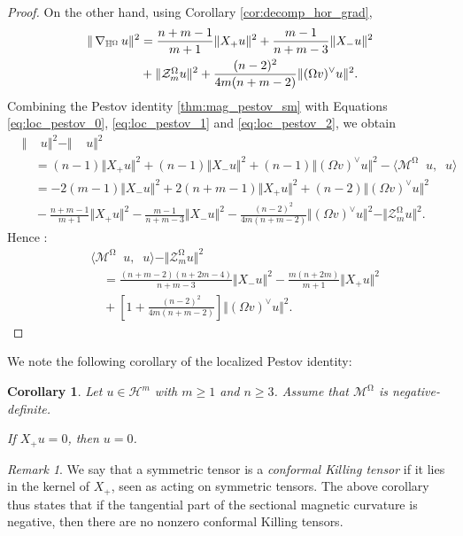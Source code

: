 \documentclass[12pt]{amsart}
\numberwithin{numbering}{section}
\theoremstyle{plain}
\newtheorem{csq}[numbering]{Corollary}
\theoremstyle{definition}
\theoremstyle{remark}
\newtheorem{rmq}[numbering]{Remark}
\numberwithin{equation}{section}
\DeclareMathOperator{\nv}{\nabla_{\mathbb{V}}}
\DeclareMathOperator{\nhs}{\nabla_{\mathbb{H}^{\mg}}}
\DeclareMathOperator{\xs}{\mathbb{X}^{\mg}}
\DeclareMathOperator{\mg}{\Omega}
\begin{document}
\begin{proof}
On the other hand, using Corollary \ref{cor:decomp_hor_grad},
\begin{align}
\Vert \nhs u \Vert^2
&= \frac{n+m-1}{m+1} \Vert X_+ u \Vert^2 + \frac{m-1}{n+m-3} \Vert X_- u \Vert^2 \label{eq:loc_pestov_2} \\
&+ \Vert \mathcal{Z}_m^{\mg} u \Vert^2 + \frac{(n-2)^2}{4m(n+m-2)} \Vert (\Omega v)^\vee u \Vert^2. \notag
\end{align}
Combining the Pestov identity \eqref{thm:mag_pestov_sm} with Equations \eqref{eq:loc_pestov_0}, \eqref{eq:loc_pestov_1} and \eqref{eq:loc_pestov_2}, we obtain 
\begin{align*}
& \Vert \nv \xs u \Vert^2 - \Vert \xs \nv u \Vert^2 \\
&\quad = (n-1) \Vert X_+ u \Vert^2 + (n-1) \Vert X_- u \Vert^2 + (n-1) \Vert ( \Omega v)^\vee u \Vert^2 - \langle \mathcal{M}^{\mg} \nv u, \nv u \rangle \\
&\quad = - 2(m-1) \Vert X_- u \Vert^2 + 2 (n+m-1) \Vert X_+ u \Vert^2 + (n-2) \Vert (\Omega v)^\vee u \Vert^2 \\
&\quad - \frac{n+m-1}{m+1} \Vert X_+ u \Vert^2 - \frac{m-1}{n+m-3} \Vert X_- u \Vert^2 - \frac{(n-2)^2}{4m(n+m-2)} \Vert (\Omega v)^\vee u \Vert^2 - \Vert \mathcal{Z}_m^{\mg} u \Vert^2.
\end{align*}
Hence :
\begin{align*}
&\langle \mathcal{M}^{\mg} \nv u, \nv u \rangle - \Vert \mathcal{Z}_m^{\mg} u \Vert^2 \\
&\quad = \frac{(n+m-2)(n+2m-4)}{n+m-3} \Vert X_- u \Vert^2 - \frac{m(n+2m)}{m+1} \Vert X_+ u \Vert^2 \\
&\quad + \left [1 + \frac{(n-2)^2}{4m(n+m-2)} \right ] \Vert (\Omega v)^\vee u \Vert^2.
\end{align*}
\end{proof}

We note the following corollary of the localized Pestov identity:
\begin{csq} \label{cor:conf_killing_tensors}
Let $u \in \mathcal{H}^m$ with $m \geq 1$ and $n \geq 3$. Assume that $\mathcal{M}^{\mg}$ is negative-definite. 

If $X_+ u = 0$, then $u = 0$.
\end{csq}

\begin{rmq}
We say that a symmetric tensor is a \emph{conformal Killing tensor} if it lies in the kernel of $X_+$, seen as acting on symmetric tensors. The above corollary thus states that if the tangential part of the sectional magnetic curvature is negative, then there are no nonzero conformal Killing tensors. 
\end{rmq}
\end{document}
